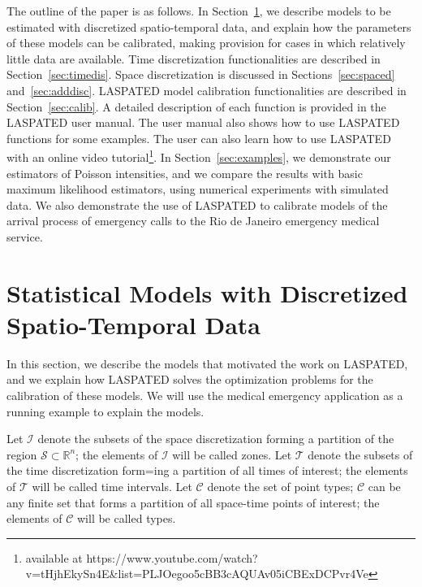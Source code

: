 \documentclass[article]{jss}
\newcommand{\RR}{\mathbb{R}}
\begin{document}
The outline of the paper is as follows. 
In Section~\ref{sec:modelcalib}, we describe models to be estimated with discretized spatio-temporal data, and explain how the parameters of these models can be calibrated, making provision for cases in which relatively little data are available.
Time discretization functionalities are described in Section~\ref{sec:timedis}.
Space discretization is discussed in Sections~\ref{sec:spaced} and~\ref{sec:adddisc}.
LASPATED model calibration functionalities are described in Section~\ref{sec:calib}.
A detailed description of each function is provided in the LASPATED user manual.
The user manual \cite{laspatedmanual} also shows how to use LASPATED functions for some examples.
The user can also learn how to use LASPATED with an online video tutorial\footnote{available at https://www.youtube.com/watch?v=tHjhEkySn4E\&list=PLJOegoo5cBB3cAQUAv05iCBExDCPvr4Ve}.
In Section~\ref{sec:examples}, we demonstrate our estimators of Poisson intensities, and we compare the results with basic maximum likelihood estimators, using numerical experiments with simulated data.
We also demonstrate the use of LASPATED to calibrate models of the arrival process of emergency calls to the Rio de Janeiro emergency medical service.

\section{Statistical Models with Discretized Spatio-Temporal Data}
\label{sec:modelcalib}

In this section, we describe the models that motivated the work on LASPATED, and we explain how LASPATED solves the optimization problems for the calibration of these models.
We will use the medical emergency application as a running example to explain the models.

Let $\mathcal{I}$ denote the subsets of the space discretization forming a partition of the region $\mathcal{S} \subset \RR^{n}$; the elements of $\mathcal{I}$ will be called zones.
Let $\mathcal{T}$ denote the subsets of the time discretization form=ing a partition of all times of interest; the elements of $\mathcal{T}$ will be called time intervals.
Let $\mathcal{C}$ denote the set of point types; $\mathcal{C}$ can be any finite set that forms a partition of all space-time points of interest; the elements of $\mathcal{C}$ will be called types.
\end{document}
